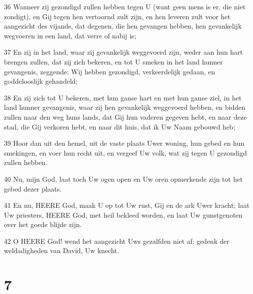 \par 36 Wanneer zij gezondigd zullen hebben tegen U (want geen mens is er, die niet zondigt), en Gij tegen hen vertoornd zult zijn, en hen leveren zult voor het aangezicht des vijands, dat degenen, die hen gevangen hebben, hen gevankelijk wegvoeren in een land, dat verre of nabij is;
\par 37 En zij in het land, waar zij gevankelijk weggevoerd zijn, weder aan hun hart brengen zullen, dat zij zich bekeren, en tot U smeken in het land hunner gevangenis, zeggende: Wij hebben gezondigd, verkeerdelijk gedaan, en goddelooslijk gehandeld;
\par 38 En zij zich tot U bekeren, met hun ganse hart en met hun ganse ziel, in het land hunner gevangenis, waar zij hen gevankelijk weggevoerd hebben, en bidden zullen naar den weg huns lands, dat Gij hun vaderen gegeven hebt, en naar deze stad, die Gij verkoren hebt, en naar dit huis, dat ik Uw Naam gebouwd heb;
\par 39 Hoor dan uit den hemel, uit de vaste plaats Uwer woning, hun gebed en hun smekingen, en voer hun recht uit, en vergeef Uw volk, wat zij tegen U gezondigd zullen hebben.
\par 40 Nu, mijn God, laat toch Uw ogen open en Uw oren opmerkende zijn tot het gebed dezer plaats.
\par 41 En nu, HEERE God, maak U op tot Uw rust, Gij en de ark Uwer kracht; laat Uw priesters, HEERE God, met heil bekleed worden, en laat Uw gunstgenoten over het goede blijde zijn.
\par 42 O HEERE God! wend het aangezicht Uws gezalfden niet af; gedenk der weldadigheden van David, Uw knecht.

\chapter{7}

